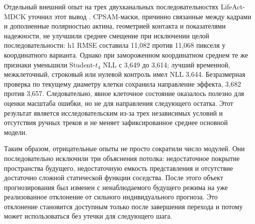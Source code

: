 \documentclass[11pt,a4paper]{article}
\begin{document}
Отдельный внешний опыт на трех двухканальных последовательностях LifeAct-MDCK уточнил этот вывод \cite{ref34}. CPSAM-маски, причинно связанные между кадрами и дополненные полярностью актина, геометрией контакта и показателями надежности, не улучшили среднее смещение при исключении целой последовательности: h1 RMSE составила 11,082 против 11,068 пикселя у координатного варианта. Однако при замороженном координатном среднем те же признаки уменьшили Student-$t_4$ NLL с 3,649 до 3,614; лучший временной, межклеточный, строковый или нулевой контроль имел NLL 3,644. Безразмерная проверка по текущему диаметру клетки сохранила направление эффекта, 3,682 против 3,657. Следовательно, явное клеточное состояние оказалось полезно для оценки масштаба ошибки, но не для направления следующего остатка. Этот результат является исследовательским из-за трех независимых условий и отсутствия ручных треков и не меняет зафиксированное среднее основной модели.

Таким образом, отрицательные опыты не просто сократили число модулей. Они последовательно исключили три объяснения потолка: недостаточное покрытие пространства будущего, недостаточную емкость представления и отсутствие достаточно сложной статической функции соседства. После этого объект прогнозирования был изменен с ненаблюдаемого будущего режима на уже реализованное отклонение от сильного индивидуального прогноза. Это отклонение становится доступным только после завершения перехода и потому может использоваться без утечки для следующего шага.
\end{document}

